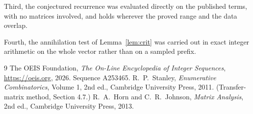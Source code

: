 \documentclass[11pt,a4paper]{article}
\theoremstyle{plain}
\theoremstyle{definition}
\begin{document}
Third, the conjectured recurrence was evaluated directly on the published terms, with no
matrices involved, and holds wherever the proved range and the data overlap.

Fourth, the annihilation test of Lemma~\ref{lem:crit} was carried out in exact integer
arithmetic on the whole vector rather than on a sampled prefix.

\begin{thebibliography}{9}
 The OEIS Foundation, \emph{The On-Line Encyclopedia of Integer
Sequences}, \url{https://oeis.org}, 2026. Sequence A253465.
 R.~P.~Stanley, \emph{Enumerative Combinatorics}, Volume 1, 2nd ed.,
Cambridge University Press, 2011. (Transfer-matrix method, Section 4.7.)
 R.~A.~Horn and C.~R.~Johnson, \emph{Matrix Analysis}, 2nd ed., Cambridge
University Press, 2013.
\end{thebibliography}
\end{document}
